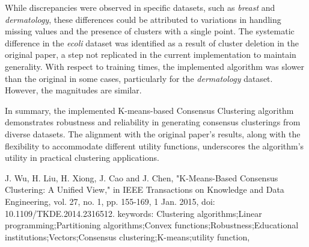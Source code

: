 \documentclass[twocolumn]{article}
\begin{document}
While discrepancies were observed in specific datasets, such as \textit{breast} and \textit{dermatology}, these differences could 
be attributed to variations in handling missing values and the presence of clusters with a single point. The systematic difference 
in the \textit{ecoli} dataset was identified as a result of cluster deletion in the original paper, a step not replicated in the current
implementation to maintain generality. With respect to training times, the implemented algorithm was slower than the original in
some cases, particularly for the \textit{dermatology} dataset. However, the magnitudes are similar.

In summary, the implemented K-means-based Consensus Clustering algorithm demonstrates robustness and reliability in generating 
consensus clusterings from diverse datasets. The alignment with the original paper's results, along with the flexibility 
to accommodate different utility functions, underscores the algorithm's utility in practical clustering applications.
  

\newpage
  \begin{thebibliography}{40}
   {\footnotesize
    J. Wu, H. Liu, H. Xiong, J. Cao and J. Chen, "K-Means-Based Consensus Clustering: A Unified View," in IEEE Transactions on Knowledge and Data Engineering, vol. 27, no. 1, pp. 155-169, 1 Jan. 2015, doi: 10.1109/TKDE.2014.2316512.
   keywords: {Clustering algorithms;Linear programming;Partitioning algorithms;Convex functions;Robustness;Educational institutions;Vectors;Consensus clustering;K-means;utility function},
     
   }
   
   \end{thebibliography}

  
\end{document}
